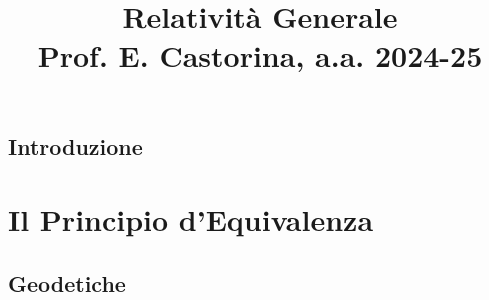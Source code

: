 \documentclass[a4paper, 12pt, openany]{book}
\title{\Huge\textbf{Relatività Generale} \\ \large Prof. E. Castorina, a.a. 2024-25}
\begin{document}
\frontmatter

\maketitle
\tableofcontents
\pagestyle{indice}

\mainmatter

\chapter*{Introduzione}

\pagestyle{introd}

\part{Il Principio d'Equivalenza}

\chapter{Geodetiche}

\end{document}
